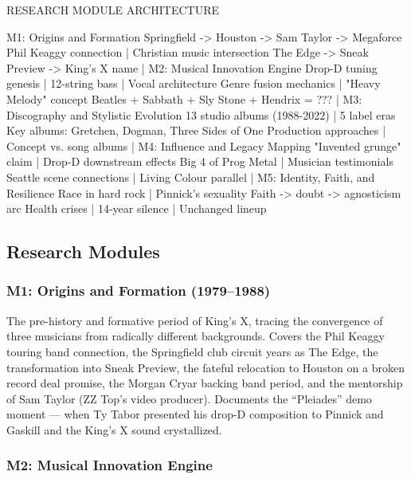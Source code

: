 \documentclass[11pt,letterpaper]{article}
\begin{document}
\begin{asciibox}
RESEARCH MODULE ARCHITECTURE

  M1: Origins and Formation
      Springfield -> Houston -> Sam Taylor -> Megaforce
      Phil Keaggy connection | Christian music intersection
      The Edge -> Sneak Preview -> King's X name
          |
  M2: Musical Innovation Engine
      Drop-D tuning genesis | 12-string bass | Vocal architecture
      Genre fusion mechanics | "Heavy Melody" concept
      Beatles + Sabbath + Sly Stone + Hendrix = ???
          |
  M3: Discography and Stylistic Evolution
      13 studio albums (1988-2022) | 5 label eras
      Key albums: Gretchen, Dogman, Three Sides of One
      Production approaches | Concept vs. song albums
          |
  M4: Influence and Legacy Mapping
      "Invented grunge" claim | Drop-D downstream effects
      Big 4 of Prog Metal | Musician testimonials
      Seattle scene connections | Living Colour parallel
          |
  M5: Identity, Faith, and Resilience
      Race in hard rock | Pinnick's sexuality
      Faith -> doubt -> agnosticism arc
      Health crises | 14-year silence | Unchanged lineup
\end{asciibox}

\subsection{Research Modules}

\subsubsection{M1: Origins and Formation (1979--1988)}

The pre-history and formative period of King's X, tracing the convergence of three musicians from radically different backgrounds. Covers the Phil Keaggy touring band connection, the Springfield club circuit years as The Edge, the transformation into Sneak Preview, the fateful relocation to Houston on a broken record deal promise, the Morgan Cryar backing band period, and the mentorship of Sam Taylor (ZZ Top's video producer). Documents the ``Pleiades'' demo moment --- when Ty Tabor presented his drop-D composition to Pinnick and Gaskill and the King's X sound crystallized.

\subsubsection{M2: Musical Innovation Engine}
\end{document}
